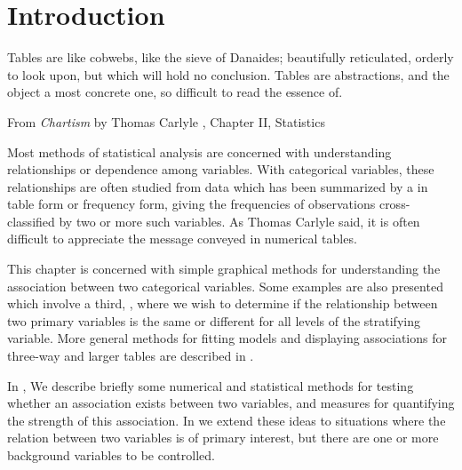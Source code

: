 \documentclass[11pt]{book}\usepackage[]{graphicx}\usepackage[]{color}
\begin{document}

\section{Introduction}\label{sec:twoway-intro}
\epigraph{Tables are like cobwebs, like the
sieve of Danaides; beautifully reticulated, orderly to look upon, but
which will hold no conclusion. Tables are abstractions, and the object a most
concrete one, so difficult to read the essence of.}{From \emph{Chartism} by Thomas Carlyle \citeyearpar{Carlyle:1840}, Chapter II, Statistics}

Most methods of statistical analysis are concerned with understanding
relationships or dependence among variables.
With categorical variables, these relationships are often
studied from data which has been
summarized by a 
in table form or frequency form,
giving the frequencies of observations cross-classified
by two or more such variables. As Thomas Carlyle said, it is often difficult
to appreciate the message conveyed in numerical tables.

This chapter is concerned with simple graphical methods for understanding the association
between two categorical variables.
Some examples are also presented which involve a third, ,
where we wish to determine if the relationship between two primary
variables is the same or different for all levels of the
stratifying variable.
More general methods for fitting models and displaying associations for three-way
and larger tables are described in .

In , We describe briefly some numerical 
and statistical
methods for testing whether an association
exists between two variables,  and measures
for quantifying the strength
of this association.
In  we extend these ideas to situations where
the relation between two variables is of primary interest, but there
are one or more background variables to be controlled.
\end{document}
